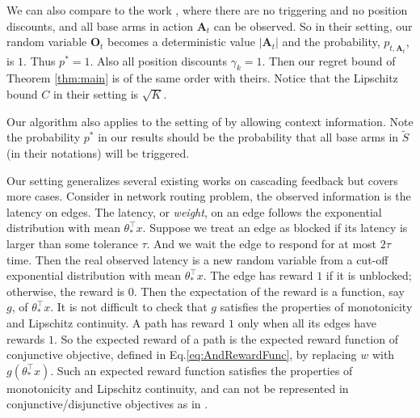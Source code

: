 \documentclass{article}
\newcommand{\bA}{\mathbf{A}}
\newcommand{\bO}{\mathbf{O}}
\begin{document}
We can also compare to the work \cite{qin2014contextual}, where there are no triggering and no position discounts, and all base arms in action $\bA_t$ can be observed. So in their setting, our random variable $\bO_t$ becomes a deterministic value $|\bA_t|$ and the probability, $p_{t, \bA_t}$, is $1$. Thus $p^{\ast} = 1$. Also all position discounts $\gamma_k = 1$. Then our regret bound of Theorem \ref{thm:main} is of the same order with theirs. Notice that the Lipschitz bound $C$ in their setting is $\sqrt{K}$.

Our algorithm also applies to the setting of \cite{chen2013combinatorial} by allowing context information. Note the probability $p^{\ast}$ in our results should be the probability that all base arms in $\tilde{S}$ (in their notations) will be triggered.

Our setting generalizes several existing works on cascading feedback but covers more cases. Consider in network routing problem, the observed information is the latency on edges. The latency, or {\it weight}, on an edge follows the exponential distribution with mean $\theta_{\ast}^{\top}x$. Suppose we treat an edge as blocked if its latency is larger than some tolerance $\tau$. And we wait the edge to respond for at most $2\tau$ time. Then the real observed latency is a new random variable from a cut-off exponential distribution with mean $\theta_{\ast}^{\top}x$. The edge has reward $1$ if it is unblocked; otherwise, the reward is $0$. Then the expectation of the reward is a function, say $g$, of $\theta_{\ast}^{\top}x$. It is not difficult to check that $g$ satisfies the properties of monotonicity and Lipschitz continuity. A path has reward $1$ only when all its edges have rewards $1$. So the expected reward of a path is the expected reward function of conjunctive objective, defined in Eq.\eqref{eq:AndRewardFunc}, by replacing $w$ with $g(\theta_{\ast}^{\top}x)$. Such an expected reward function satisfies the properties of monotonicity and Lipschitz continuity, and can not be represented in conjunctive/disjunctive objectives as in \cite{kveton2015cascading,kveton2015combinatorial}.
\end{document}
